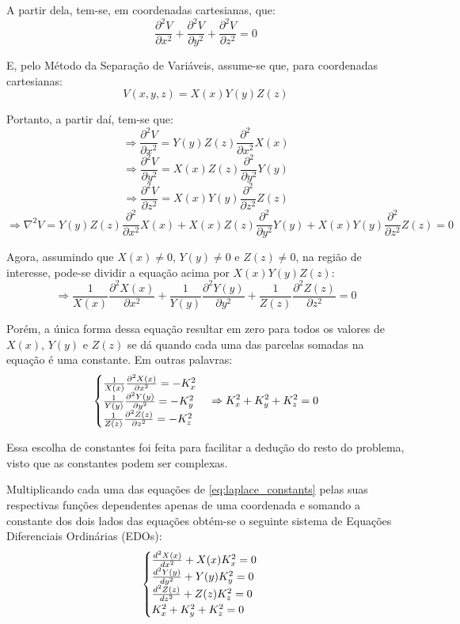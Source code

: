 \documentclass{report}
\begin{document}
A partir dela, tem-se, em coordenadas cartesianas, que:
$$ \frac{\partial^2 V}{\partial x^2} + \frac{\partial^2 V}{\partial y^2} + \frac{\partial^2 V}{\partial z^2} = 0 $$

E, pelo Método da Separação de Variáveis, assume-se que, para coordenadas cartesianas:
$$ V(x, y, z) = X(x)Y(y)Z(z) $$

Portanto, a partir daí, tem-se que:
$$ \Rightarrow \frac{\partial^2 V}{\partial x^2} = Y(y)Z(z)\frac{\partial^2}{\partial x^2}X(x) $$
$$ \Rightarrow \frac{\partial^2 V}{\partial y^2} = X(x)Z(z)\frac{\partial^2}{\partial y^2}Y(y) $$
$$ \Rightarrow \frac{\partial^2 V}{\partial z^2} = X(x)Y(y)\frac{\partial^2}{\partial z^2}Z(z) $$
$$ \Rightarrow \nabla^2 V = Y(y)Z(z)\frac{\partial^2}{\partial x^2}X(x) + X(x)Z(z)\frac{\partial^2}{\partial y^2}Y(y) + X(x)Y(y)\frac{\partial^2}{\partial z^2}Z(z) = 0 $$

Agora, assumindo que $ X(x) \neq 0 $, $ Y(y) \neq 0 $ e $ Z(z) \neq 0 $, na região de interesse, pode-se dividir a equação acima por $ X(x)Y(y)Z(z) $:
$$ \Rightarrow \frac{1}{X(x)}\frac{\partial^2 X(x)}{\partial x^2} + \frac{1}{Y(y)}\frac{\partial^2 Y(y)}{\partial y^2} + \frac{1}{Z(z)}\frac{\partial^2 Z(z)}{\partial z^2} = 0 $$

Porém, a única forma dessa equação resultar em zero para todos os valores de $ X(x) $, $ Y(y) $ e $ Z(z) $ se dá quando cada uma das parcelas somadas na equação é uma constante.
Em outras palavras:
\begin{equation}
  \label{eq:laplace_constants}
  \centering
  \begin{cases}
    \frac{1}{X(x)}\frac{\partial^2 X(x)}{\partial x^2} = -K_x^2 \\
    \frac{1}{Y(y)}\frac{\partial^2 Y(y)}{\partial y^2} = -K_y^2 \\
    \frac{1}{Z(z)}\frac{\partial^2 Z(z)}{\partial z^2} = -K_z^2
  \end{cases}
  \Rightarrow K_x^2 + K_y^2 + K_z^2 = 0
\end{equation}

Essa escolha de constantes foi feita para facilitar a dedução do resto do problema, visto que as constantes podem ser complexas.

Multiplicando cada uma das equações de \ref{eq:laplace_constants} pelas suas respectivas funções dependentes apenas de uma coordenada e somando
a constante dos dois lados das equações obtém-se o seguinte sistema de Equações Diferenciais Ordinárias (EDOs):
\begin{equation}
    \label{eq:laplace_edos}
    \centering
    \begin{cases}
      \frac{d^2 X(x)}{dx^2} + X(x)K_x^2 = 0 \\
      \frac{d^2 Y(y)}{dy^2} + Y(y)K_y^2 = 0 \\
      \frac{d^2 Z(z)}{dz^2} + Z(z)K_z^2 = 0 \\
      K_x^2 + K_y^2 + K_z^2 = 0
    \end{cases}
  \end{equation}
\end{document}
